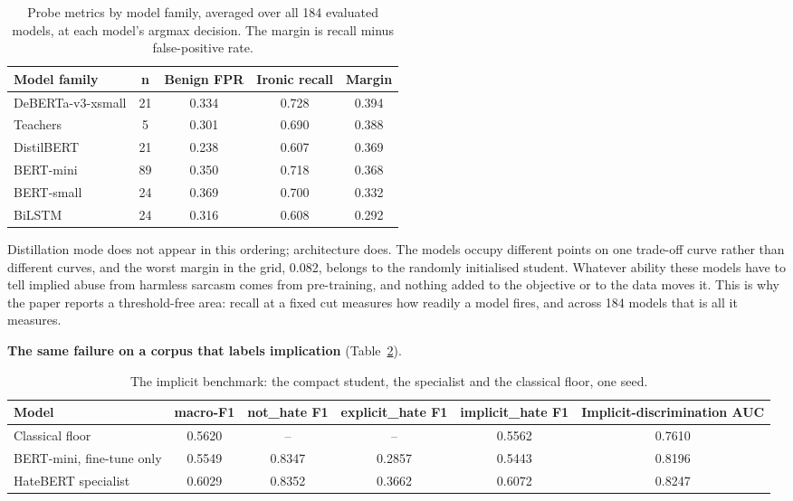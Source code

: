 \begin{table}[htbp]
\centering
\small
\caption[Probe metrics by model family]{Probe metrics by model family, averaged over all 184 evaluated models, at each model's argmax decision. The margin is recall minus false-positive rate.}
\label{tab:families}
\begin{adjustbox}{max width=\textwidth}
\begin{tabular}{lcccc}
\toprule
Model family & n & Benign FPR & Ironic recall & Margin \\
\midrule
DeBERTa-v3-xsmall & 21 & 0.334 & 0.728 & 0.394 \\
Teachers & 5 & 0.301 & 0.690 & 0.388 \\
DistilBERT & 21 & 0.238 & 0.607 & 0.369 \\
BERT-mini & 89 & 0.350 & 0.718 & 0.368 \\
BERT-small & 24 & 0.369 & 0.700 & 0.332 \\
BiLSTM & 24 & 0.316 & 0.608 & 0.292 \\
\bottomrule
\end{tabular}
\end{adjustbox}
\end{table}

Distillation mode does not appear in this ordering; architecture does. The models occupy different
points on one trade-off curve rather than different curves, and the worst margin in the grid, 0.082,
belongs to the randomly initialised student. Whatever ability these models have to tell implied
abuse from harmless sarcasm comes from pre-training, and nothing added to the objective or to the
data moves it. This is why the paper reports a threshold-free area: recall at a fixed cut measures
how readily a model fires, and across 184 models that is all it measures.

\textbf{The same failure on a corpus that labels implication} (Table~\ref{tab:implicit}).

\begin{table}[htbp]
\centering
\small
\caption{The implicit benchmark: the compact student, the specialist and the classical floor, one seed.}
\label{tab:implicit}
\begin{adjustbox}{max width=\textwidth}
\begin{tabular}{lccccc}
\toprule
Model & macro-F1 & not\_hate F1 & explicit\_hate F1 & implicit\_hate F1 & Implicit-discrimination AUC \\
\midrule
Classical floor & 0.5620 & -- & -- & 0.5562 & 0.7610 \\
BERT-mini, fine-tune only & 0.5549 & 0.8347 & 0.2857 & 0.5443 & 0.8196 \\
HateBERT specialist & 0.6029 & 0.8352 & 0.3662 & 0.6072 & 0.8247 \\
\bottomrule
\end{tabular}
\end{adjustbox}
\end{table}

